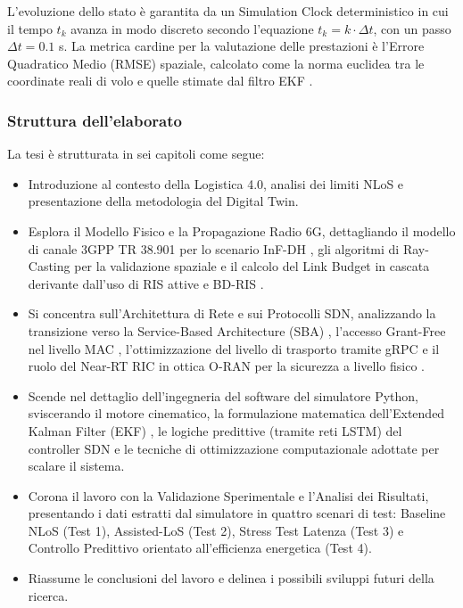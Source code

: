 \documentclass[twoside]{article}
\begin{document}
L'evoluzione dello stato è garantita da un Simulation Clock deterministico in cui il tempo $t_k$ avanza in modo discreto secondo l'equazione $t_k = k \cdot \Delta t$, con un passo $\Delta t = 0.1$ s. La metrica cardine per la valutazione delle prestazioni è l'Errore Quadratico Medio (RMSE) spaziale, calcolato come la norma euclidea tra le coordinate reali di volo e quelle stimate dal filtro EKF \cite{Muller2024,Ye2023}.

\subsubsection*{Struttura dell'elaborato}
La tesi è strutturata in sei capitoli come segue:
\begin{itemize}[leftmargin=2.8cm, labelwidth=2.5cm, labelsep=0.3cm, itemindent=0cm, align=left]
    \item[\textbf{Capitolo 1:}] Introduzione al contesto della Logistica 4.0, analisi dei limiti NLoS e presentazione della metodologia del Digital Twin.
    \item[\textbf{Capitolo 2:}] Esplora il Modello Fisico e la Propagazione Radio 6G, dettagliando il modello di canale 3GPP TR 38.901 per lo scenario InF-DH \cite{Gebretsadik2024,Poddar2024}, gli algoritmi di Ray-Casting per la validazione spaziale \cite{Huang2022} e il calcolo del Link Budget in cascata derivante dall'uso di RIS attive \cite{Zhang2022} e BD-RIS \cite{Khan2024}.
    \item[\textbf{Capitolo 3:}] Si concentra sull'Architettura di Rete e sui Protocolli SDN, analizzando la transizione verso la Service-Based Architecture (SBA) \cite{Kolakowski2024}, l'accesso Grant-Free nel livello MAC \cite{Yu2024}, l'ottimizzazione del livello di trasporto tramite gRPC \cite{Vairam2023} e il ruolo del Near-RT RIC in ottica O-RAN per la sicurezza a livello fisico \cite{Lien2024}.
    \item[\textbf{Capitolo 4:}] Scende nel dettaglio dell'ingegneria del software del simulatore Python, sviscerando il motore cinematico, la formulazione matematica dell'Extended Kalman Filter (EKF) \cite{Muller2024,Ye2023}, le logiche predittive (tramite reti LSTM) del controller SDN \cite{Wang2024,Wei2024} e le tecniche di ottimizzazione computazionale adottate per scalare il sistema.
    \item[\textbf{Capitolo 5:}] Corona il lavoro con la Validazione Sperimentale e l'Analisi dei Risultati, presentando i dati estratti dal simulatore in quattro scenari di test: Baseline NLoS (Test 1), Assisted-LoS (Test 2), Stress Test Latenza \cite{Vairam2023,Lien2024} (Test 3) e Controllo Predittivo orientato all'efficienza energetica \cite{Wang2024,Khan2024} (Test 4).
    \item[\textbf{Capitolo 6:}] Riassume le conclusioni del lavoro e delinea i possibili sviluppi futuri della ricerca.
\end{itemize}
\end{document}
